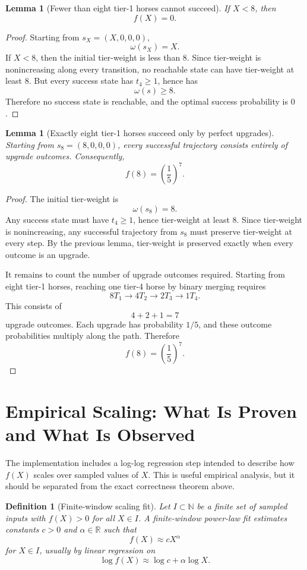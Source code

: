 \documentclass[11pt]{article}
\newtheorem{lemma}[theorem]{Lemma}
\newtheorem{definition}[theorem]{Definition}
\newcommand{\N}{\mathbb{N}}
\newcommand{\R}{\mathbb{R}}
\newcommand{\weight}{\omega}
\begin{document}
\begin{lemma}[Fewer than eight tier-1 horses cannot succeed]
If \(X<8\), then
\[
    f(X)=0.
\]
\end{lemma}

\begin{proof}
Starting from \(s_X=(X,0,0,0)\),
\[
    \weight(s_X)=X.
\]
If \(X<8\), then the initial tier-weight is less than \(8\).  Since tier-weight is nonincreasing along every transition, no reachable state can have tier-weight at least \(8\).  But every success state has \(t_4\ge1\), hence has
\[
    \weight(s)\ge 8.
\]
Therefore no success state is reachable, and the optimal success probability is \(0\).
\end{proof}

\begin{lemma}[Exactly eight tier-1 horses succeed only by perfect upgrades]
Starting from \(s_8=(8,0,0,0)\), every successful trajectory consists entirely of upgrade outcomes.  Consequently,
\[
    f(8)=\left(\frac15\right)^7.
\]
\end{lemma}

\begin{proof}
The initial tier-weight is
\[
    \weight(s_8)=8.
\]
Any success state must have \(t_4\ge1\), hence tier-weight at least \(8\).  Since tier-weight is nonincreasing, any successful trajectory from \(s_8\) must preserve tier-weight at every step.  By the previous lemma, tier-weight is preserved exactly when every outcome is an upgrade.

It remains to count the number of upgrade outcomes required.  Starting from eight tier-1 horses, reaching one tier-4 horse by binary merging requires
\[
    8T_1 \to 4T_2 \to 2T_3 \to 1T_4.
\]
This consists of
\[
    4+2+1=7
\]
upgrade outcomes.  Each upgrade has probability \(1/5\), and these outcome probabilities multiply along the path.  Therefore
\[
    f(8)=\left(\frac15\right)^7.
\]
\end{proof}

\section{Empirical Scaling: What Is Proven and What Is Observed}

The implementation includes a log-log regression step intended to describe how \(f(X)\) scales over sampled values of \(X\).  This is useful empirical analysis, but it should be separated from the exact correctness theorem above.

\begin{definition}[Finite-window scaling fit]
Let \(I\subset\N\) be a finite set of sampled inputs with \(f(X)>0\) for all \(X\in I\).  A finite-window power-law fit estimates constants \(c>0\) and \(\alpha\in\R\) such that
\[
    f(X)\approx cX^\alpha
\]
for \(X\in I\), usually by linear regression on
\[
    \log f(X)\approx \log c+\alpha\log X.
\]
\end{definition}
\end{document}
